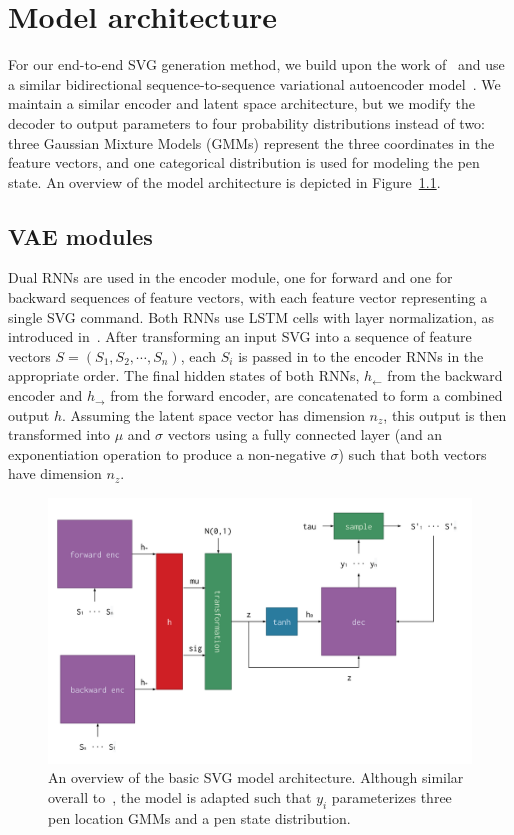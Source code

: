 \chapter{Model architecture}\label{chap:architecture}
For our end-to-end SVG generation method, we build upon the work of~\citeauthor{ha2017neural} and use a similar bidirectional sequence-to-sequence variational autoencoder model~\cite{ha2017neural}.
We maintain a similar encoder and latent space architecture, but we modify the decoder to output parameters to four probability distributions instead of two: three Gaussian Mixture Models (GMMs) represent the three coordinates in the feature vectors, and one categorical distribution is used for modeling the pen state.
An overview of the model architecture is depicted in Figure~\ref{fig:architecture}.

\section{VAE modules}
Dual RNNs are used in the encoder module, one for forward and one for backward sequences of feature vectors, with each feature vector representing a single SVG command.
Both RNNs use LSTM cells with layer normalization, as introduced in~\cite{ba2016layer}.
After transforming an input SVG into a sequence of feature vectors $S = (S_1, S_2, \cdots, S_n)$, each $S_i$ is passed in to the encoder RNNs in the appropriate order.
The final hidden states of both RNNs, $h_\leftarrow$ from the backward encoder and $h_\to$ from the forward encoder, are concatenated to form a combined output $h$.
Assuming the latent space vector has dimension $n_z$, this output is then transformed into $\mu$ and $\sigma$ vectors using a fully connected layer (and an exponentiation operation to produce a non-negative $\sigma$) such that both vectors have dimension $n_z$.

\begin{figure}[h]
\centering
\caption[An overview of the basic SVG model architecture]{An overview of the basic SVG model architecture.
Although similar overall to~\cite{ha2017neural}, the model is adapted such that $y_i$ parameterizes three pen location GMMs and a pen state distribution.\label{fig:architecture}}
\includegraphics[width=\textwidth]{figures/architecture}
\end{figure}

